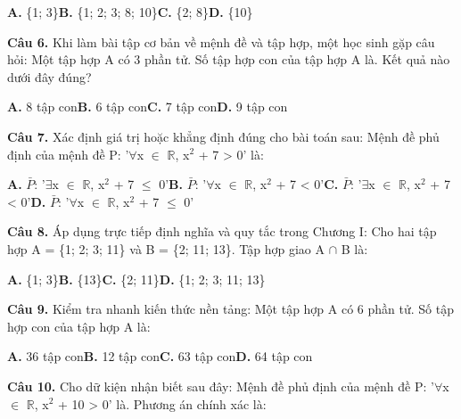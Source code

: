 \documentclass[11pt,a4paper]{article}
\begin{document}
\hspace*{1.5em}\textbf{A.} \{1; 3\}\quad\quad \textbf{B.} \{1; 2; 3; 8; 10\}\quad\quad \textbf{C.} \{2; 8\}\quad\quad \textbf{D.} \{10\}\par\vspace{2pt}
\textbf{\color{primary} Câu 6.} Khi làm bài tập cơ bản về mệnh đề và tập hợp, một học sinh gặp câu hỏi: Một tập hợp A có 3 phần tử. Số tập hợp con của tập hợp A là. Kết quả nào dưới đây đúng?\par
\hspace*{1.5em}\textbf{A.} 8 tập con\quad\quad \textbf{B.} 6 tập con\quad\quad \textbf{C.} 7 tập con\quad\quad \textbf{D.} 9 tập con\par\vspace{2pt}
\textbf{\color{primary} Câu 7.} Xác định giá trị hoặc khẳng định đúng cho bài toán sau: Mệnh đề phủ định của mệnh đề P: '$\forall$x $\in$ $\mathbb{R}$, x$^2$ + 7 > 0' là:\par
\hspace*{1.5em}\textbf{A.} $\bar{P}$: '$\exists$x $\in$ $\mathbb{R}$, x$^2$ + 7 $\le$ 0'\quad\quad \textbf{B.} $\bar{P}$: '$\forall$x $\in$ $\mathbb{R}$, x$^2$ + 7 < 0'\quad\quad \textbf{C.} $\bar{P}$: '$\exists$x $\in$ $\mathbb{R}$, x$^2$ + 7 < 0'\quad\quad \textbf{D.} $\bar{P}$: '$\forall$x $\in$ $\mathbb{R}$, x$^2$ + 7 $\le$ 0'\par\vspace{2pt}
\textbf{\color{primary} Câu 8.} Áp dụng trực tiếp định nghĩa và quy tắc trong Chương I: Cho hai tập hợp A = \{1; 2; 3; 11\} và B = \{2; 11; 13\}. Tập hợp giao A $\cap$ B là:\par
\hspace*{1.5em}\textbf{A.} \{1; 3\}\quad\quad \textbf{B.} \{13\}\quad\quad \textbf{C.} \{2; 11\}\quad\quad \textbf{D.} \{1; 2; 3; 11; 13\}\par\vspace{2pt}
\textbf{\color{primary} Câu 9.} Kiểm tra nhanh kiến thức nền tảng: Một tập hợp A có 6 phần tử. Số tập hợp con của tập hợp A là:\par
\hspace*{1.5em}\textbf{A.} 36 tập con\quad\quad \textbf{B.} 12 tập con\quad\quad \textbf{C.} 63 tập con\quad\quad \textbf{D.} 64 tập con\par\vspace{2pt}
\textbf{\color{primary} Câu 10.} Cho dữ kiện nhận biết sau đây: Mệnh đề phủ định của mệnh đề P: '$\forall$x $\in$ $\mathbb{R}$, x$^2$ + 10 > 0' là. Phương án chính xác là:\par
\end{document}
